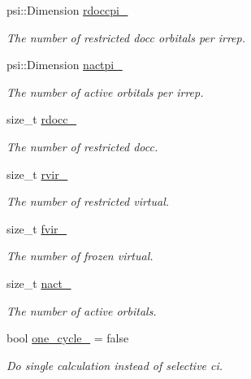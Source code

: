 \begin{DoxyCompactItemize}
psi\+::\+Dimension \mbox{\hyperlink{classforte_1_1_selected_c_i_method_ada7fb62618582c9225d6bcb7a836026b}{rdoccpi\+\_\+}}
\begin{DoxyCompactList}\small\item\em The number of restricted docc orbitals per irrep. \end{DoxyCompactList}\item 
psi\+::\+Dimension \mbox{\hyperlink{classforte_1_1_selected_c_i_method_a40a318f83de62e409f970cdf4d55387a}{nactpi\+\_\+}}
\begin{DoxyCompactList}\small\item\em The number of active orbitals per irrep. \end{DoxyCompactList}\item 
size\+\_\+t \mbox{\hyperlink{classforte_1_1_selected_c_i_method_a8d936fc87c8ac79d130fcef2b1c76870}{rdocc\+\_\+}}
\begin{DoxyCompactList}\small\item\em The number of restricted docc. \end{DoxyCompactList}\item 
size\+\_\+t \mbox{\hyperlink{classforte_1_1_selected_c_i_method_a3893d3b6d53bf7e92d9a5fee01f03908}{rvir\+\_\+}}
\begin{DoxyCompactList}\small\item\em The number of restricted virtual. \end{DoxyCompactList}\item 
size\+\_\+t \mbox{\hyperlink{classforte_1_1_selected_c_i_method_a9f397e1dfb26cfe5319359a44e704879}{fvir\+\_\+}}
\begin{DoxyCompactList}\small\item\em The number of frozen virtual. \end{DoxyCompactList}\item 
size\+\_\+t \mbox{\hyperlink{classforte_1_1_selected_c_i_method_a1bbd2bdafa78a2e65219ff6e8e888b7f}{nact\+\_\+}}
\begin{DoxyCompactList}\small\item\em The number of active orbitals. \end{DoxyCompactList}\item 
bool \mbox{\hyperlink{classforte_1_1_selected_c_i_method_a4a86414b37bde1ebd486a3c730852d7a}{one\+\_\+cycle\+\_\+}} = false
\begin{DoxyCompactList}\small\item\em Do single calculation instead of selective ci. \end{DoxyCompactList}\item 

\end{DoxyCompactItemize}
